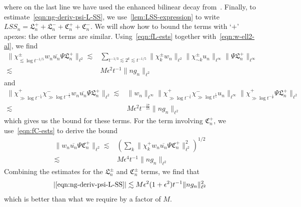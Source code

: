 \documentclass[letterpaper, reqno,final]{amsart}
\newcommand{\fC}{\mathfrak{C}}
\newcommand{\fL}{\mathfrak{L}}
\newcommand{\mSS}{\mathit{SS}}
\begin{document}
where on the last line we have used the enhanced bilinear decay from~.  Finally, to estimate~\eqref{eqn:ng-deriv-psi-L-SS}, we use~\cref{lem:LSS-expression} to write $L \mSS_n = \fL_n^{+} + \fL_n^{-} + \fC_n^+ + \fC_n^-$.  We will show how to bound the terms with `$+$' apexes: the other terms are similar.  Using~\eqref{eqn:fL-ests} together with~\eqref{eqn:w-ell2-al}, we find
\begin{equation*}\begin{split}
    \lVert \chi_{\lesssim \log t^{-1/5}}^\pm w_n \overline{u_n} \Psi \fL_n^+ \rVert_{\ell^2}\lesssim&
    \sum_{t^{-1/3} \lesssim 2^k \lesssim t^{-1/5}} \lVert \chi_{k}^\pm w_n \rVert_{\ell^2} \lVert \chi_{\sim k}^\pm u_n\rVert_{\ell^\infty} \lVert\Psi \fL^{+}_n\rVert_{\ell^\infty}\\
    \lesssim& M \epsilon^2 t^{-1}\lVert ng_n \rVert_{\ell^2}    
\end{split}\end{equation*}
and
\begin{equation*}\begin{split}
    \lVert \chi_{\gg \log t^{-\frac{1}{5}}}^+\chi_{\gg \log t^{-\frac{1}{5}}}^- w_n \overline{u_n} \Psi \fL_n^+ \rVert_{\ell^2}\lesssim& \lVert w_n \rVert_{\ell^\infty} \lVert \chi_{\gg \log t^{-\frac{1}{5}}}^+\chi_{\gg \log t^\frac{1}{5}}^- u_n \rVert_{\ell^\infty} \lVert \chi_{\gg \log t^{-\frac{1}{5}}}^+ \Psi \fL^+_n \rVert_{\ell^2}\\
    \lesssim& M \epsilon^2 t^{-\frac{17}{15}}\lVert ng_n \rVert_{\ell^2}
\end{split}\end{equation*}
which gives us the bound for these terms.  For the term involving $\fC_n^+$, we use~\eqref{eqn:fC-ests} to derive the bound
\begin{equation*}\begin{split}
    \lVert w_n \overline{u_n} \Psi \fC_n^+ \rVert_{\ell^2} \lesssim& \left( \sum_{k} \lVert \chi_{k}^+   w_n \overline{u_n} \Psi \fC_n^+ \rVert_{\ell^2}^2\right)^{1/2}\\
    \lesssim& M \epsilon^4 t^{-1}\lVert ng_n \rVert_{\ell^2}
\end{split}\end{equation*}
Combining the estimates for the $\fL^\pm_n$ and $\fC^\pm_n$ terms, we find that
\begin{equation*}
    |\eqref{eqn:ng-deriv-psi-L-SS}| \lesssim M \epsilon^2(1 + \epsilon^2) t^{-1}\lVert ng_n \rVert_{\ell^2}^2
\end{equation*}
which is better than what we require by a factor of $M$.
	
\end{document}
